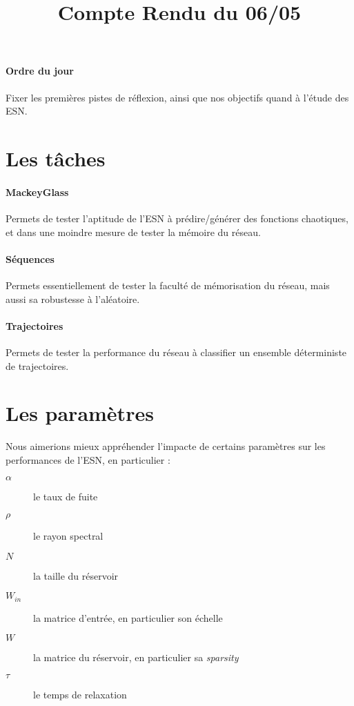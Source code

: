 \documentclass[12pt]{article}
\title{Compte Rendu du 06/05}
\author{}
\date{}
\begin{document}
\maketitle

\paragraph{Ordre du jour}
Fixer les premières pistes de réflexion, ainsi que nos objectifs quand à l'étude des ESN.

\section{Les tâches}
\paragraph{MackeyGlass}
Permets de tester l'aptitude de l'ESN à prédire/générer des fonctions chaotiques, et dans une moindre mesure de tester la mémoire du réseau.
\paragraph{Séquences}
Permets essentiellement de tester la faculté de mémorisation du réseau, mais aussi sa robustesse à l'aléatoire.
\paragraph{Trajectoires}
Permets de tester la performance du réseau à classifier un ensemble déterministe de trajectoires.

\section{Les paramètres}
Nous aimerions mieux appréhender l'impacte de certains paramètres sur les performances de l'ESN, en particulier :
\begin{description}
\item[$\alpha$] le taux de fuite
\item[$\rho$] le rayon spectral
\item[$N$] la taille du réservoir
\item[$W_{in}$] la matrice d'entrée, en particulier son échelle
\item[$W$] la matrice du réservoir, en particulier sa \textit{sparsity}
\item[$\tau$] le temps de relaxation
\end{description}
\end{document}
